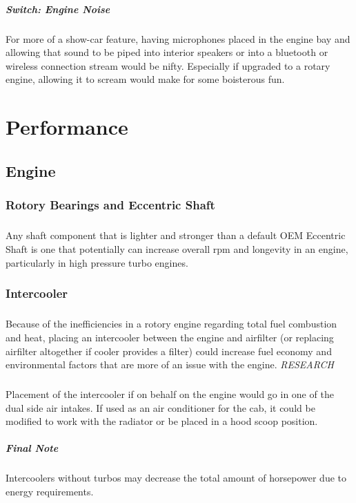 \documentclass[a4paper,10pt]{report}
\begin{document}
\paragraph*{Switch: Engine Noise}For more of a show-car feature, having microphones placed in the engine bay and allowing that sound to be piped into interior speakers or into a bluetooth or wireless connection stream would be nifty. Especially if upgraded to a rotary engine, allowing it to scream would make for some boisterous fun.


\chapter{Performance}
\section{Engine}
\subsection{Rotory Bearings and Eccentric Shaft} 
\paragraph*{}Any shaft component that is lighter and stronger than a default OEM Eccentric Shaft is one that potentially can increase overall rpm and longevity in an engine, particularly in high pressure turbo engines.
\subsection{Intercooler} 
\paragraph*{}Because of the inefficiencies in a rotory engine regarding total fuel combustion and heat, placing an intercooler between the engine and airfilter (or replacing airfilter altogether if cooler provides a filter) could increase fuel economy and environmental factors that are more of an issue with the engine. \textit{RESEARCH}
\paragraph*{}Placement of the intercooler if on behalf on the engine would go in one of the dual side air intakes. If used as an air conditioner for the cab, it could be modified to work with the radiator or be placed in a hood scoop position.
\paragraph*{Final Note} Intercoolers without turbos may decrease the total amount of horsepower due to energy requirements.
\end{document}
